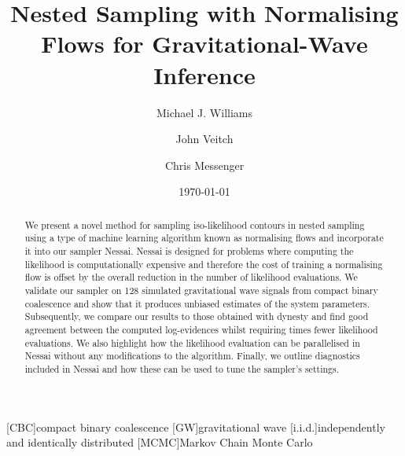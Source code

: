 \documentclass[%
 reprint,
nofootinbib,
 amsmath,amssymb,
 aps,
 prd,
]{revtex4-2}
\newcommand{\nessai}{{\sc Nessai}\xspace}
\newcommand{\dynesty}{{\sc dynesty}\xspace}
\begin{document}



\title{Nested Sampling with Normalising Flows for Gravitational-Wave Inference}%

\author{Michael J. Williams}
\author{John Veitch}
\author{Chris Messenger}%
%


\date{\today}%

\begin{abstract}

We present a novel method for sampling iso-likelihood contours in nested sampling using a type of machine learning algorithm known as normalising flows and incorporate it into our sampler \nessai. \nessai is designed for problems where computing the likelihood is computationally expensive and therefore the cost of training a normalising flow is offset by the overall reduction in the number of likelihood evaluations. We validate our sampler on 128 simulated gravitational wave signals from compact binary coalescence and show that it produces %
unbiased estimates of the system parameters.
Subsequently, we compare our results to those obtained with \dynesty and find good agreement between the computed log-evidences whilst requiring \evaluationsratio times fewer likelihood evaluations. We also highlight how the likelihood evaluation can be parallelised in \nessai without any modifications to the algorithm. Finally, we outline diagnostics included in \nessai and how these can be used to tune the sampler's settings.

\end{abstract}

\maketitle

[CBC]{compact binary coalescence}
[GW]{gravitational wave}
[i.i.d.]{independently and identically distributed}
[MCMC]{Markov Chain Monte Carlo}
\end{document}

